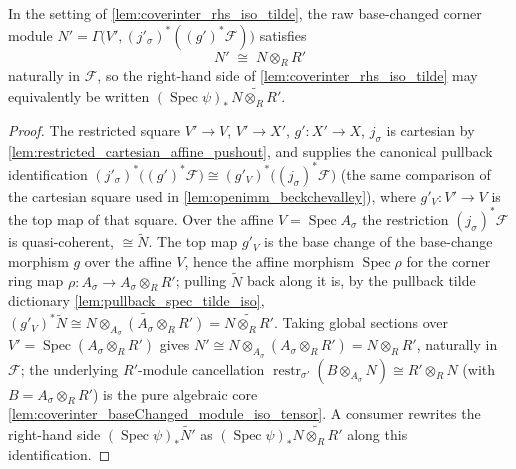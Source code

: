 \begin{lemma}\leanok
  \label{lem:coverinter_rhs_tensor_rewrite}
  In the setting of \cref{lem:coverinter_rhs_iso_tilde}, the raw base-changed corner module
  \(N' = \Gamma\bigl(V', (j'_\sigma)^*((g')^*\mathcal{F})\bigr)\) satisfies
  \[
    N' \;\cong\; N \otimes_R R'
  \]
  naturally in \(\mathcal{F}\), so the right-hand side of
  \cref{lem:coverinter_rhs_iso_tilde} may equivalently be written
  \((\operatorname{Spec}\psi)_*\,\widetilde{N \otimes_R R'}\).
\end{lemma}
\begin{proof}
  \leanok
  The restricted square
  \(V' \to V\), \(V' \to X'\), \(g' : X' \to X\), \(j_\sigma\) is cartesian by
  \cref{lem:restricted_cartesian_affine_pushout}, and supplies the canonical pullback
  identification \((j'_\sigma)^*\bigl((g')^*\mathcal{F}\bigr) \cong
  (g'_V)^*\bigl((j_\sigma)^*\mathcal{F}\bigr)\) (the same comparison of the cartesian square used
  in \cref{lem:openimm_beckchevalley}), where \(g'_V : V' \to V\) is the top map of that square.
  Over the affine \(V = \operatorname{Spec} A_\sigma\) the restriction \((j_\sigma)^*\mathcal{F}\)
  is quasi-coherent, \(\cong \widetilde{N}\). The top map \(g'_V\) is the base change of the
  base-change morphism \(g\) over the affine \(V\), hence the affine morphism
  \(\operatorname{Spec}\rho\) for the corner ring map \(\rho : A_\sigma \to A_\sigma \otimes_R R'\);
  pulling \(\widetilde{N}\) back along it is, by the pullback tilde dictionary
  \cref{lem:pullback_spec_tilde_iso},
  \((g'_V)^*\widetilde{N} \cong \widetilde{N \otimes_{A_\sigma}(A_\sigma \otimes_R R')}
  = \widetilde{N \otimes_R R'}\). Taking global sections over
  \(V' = \operatorname{Spec}(A_\sigma \otimes_R R')\) gives
  \(N' \cong N \otimes_{A_\sigma}(A_\sigma \otimes_R R') = N \otimes_R R'\), naturally in
  \(\mathcal{F}\); the underlying \(R'\)-module cancellation
  \(\operatorname{restr}_{\sigma'}(B \otimes_{A_\sigma} N) \cong R' \otimes_R N\) (with
  \(B = A_\sigma \otimes_R R'\)) is the pure algebraic core
  \cref{lem:coverinter_baseChanged_module_iso_tensor}. A consumer rewrites the right-hand side
  \((\operatorname{Spec}\psi)_*\widetilde{N'}\) as
  \((\operatorname{Spec}\psi)_*\widetilde{N \otimes_R R'}\) along this identification.
\end{proof}

